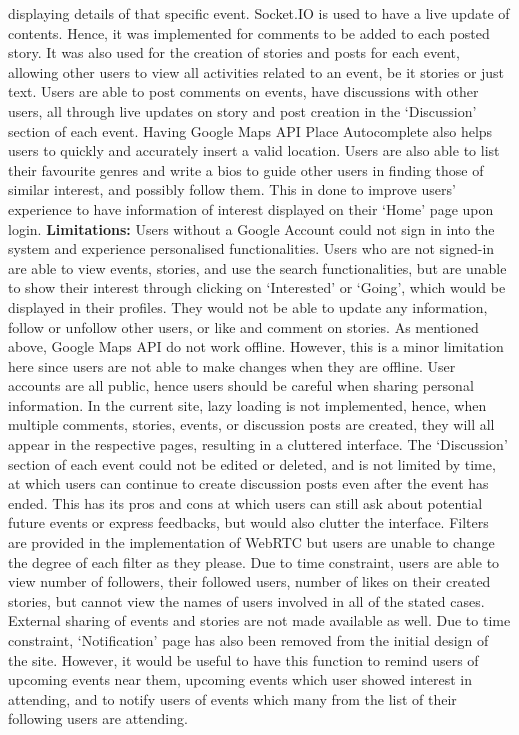 \documentclass[11pt, a4paper]{article}
\begin{document}
displaying details of that specific event. Socket.IO is used to have a live update of contents.
Hence, it was implemented for comments to be added to each posted story. It was also used for the
creation of stories and posts for each event, allowing other users to view all activities related
to an event, be it stories or just text. Users are able to post comments on events, have
discussions with other users, all through live updates on story and post creation in the
`Discussion' section of each event. Having Google Maps API Place Autocomplete also helps users to 
quickly and accurately insert a valid location. Users are also able to list their favourite
genres and write a bios to guide other users in finding those of similar interest, and possibly
follow them. This in done to improve users' experience to have information of interest displayed
on their `Home' page upon login. \textbf{Limitations:} Users without a Google Account could not
sign in into the system and experience personalised functionalities. Users who are not signed-in are
able to view events, stories, and use the search functionalities, but are unable to show their
interest through clicking on `Interested' or `Going', which would be displayed in their profiles.
They would not be able to update any information, follow or unfollow other users, or like and
comment on stories. As mentioned above, Google Maps API do not work offline. However, this is a
minor limitation here since users are not able to make changes when they are offline. User accounts
are all public, hence users should be careful when sharing personal information. In the current site,
lazy loading is not implemented, hence, when multiple comments, stories, events, or discussion posts
are created, they will all appear in the respective pages, resulting in a cluttered interface. The
`Discussion' section of each event could not be edited or deleted, and is not limited by time, at
which users can continue to create discussion posts even after the event has ended. This has its pros
and cons at which users can still ask about potential future events or express feedbacks, but would
also clutter the interface. Filters are provided in the implementation of WebRTC but users are unable
to change the degree of each filter as they please. Due to time constraint, users are able to view
number of followers, their followed users, number of likes on their created stories, but cannot view
the names of users involved in all of the stated cases. External sharing of events and stories are
not made available as well. Due to time constraint, `Notification' page has also been removed from
the initial design of the site. However, it would be useful to have this function to remind users
of upcoming events near them, upcoming events which user showed interest in attending, and to notify
users of events which many from the list of their following users are attending.
\end{document}
